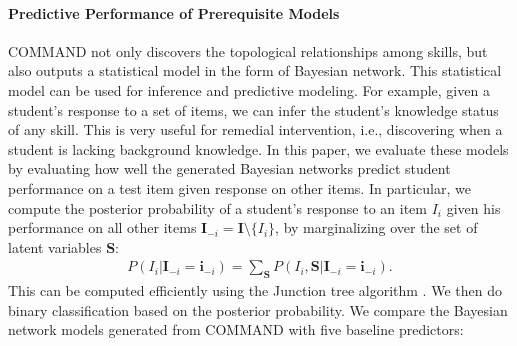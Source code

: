 \documentclass{edm_template}
\begin{document}
	\paragraph{Predictive Performance of Prerequisite Models}
	\label{sec:predictive_performance}
	COMMAND not only discovers the topological relationships among skills, but also outputs a statistical model in the form of Bayesian network.
	This statistical model can be used for inference and predictive modeling.
	For example, given a student's response to a set of items, we can infer the student's knowledge status of any skill.
	This is very useful for remedial intervention, i.e., discovering when a student is lacking background knowledge. 
	In this paper, we evaluate these models by evaluating how well the generated Bayesian networks predict student performance
	on a test item given response on other items.
	In particular, we compute the posterior probability of a student's response to an item $I_i$ given his performance on all other items 
	$\mathbf{I}_{-i}=\mathbf{I}\setminus\{I_i\}$, by marginalizing over the set of latent variables $\mathbf{S}$:
	\begin{align}
		P(I_i|\mathbf{I}_{-i}=\mathbf{i}_{-i}) =\sum_{\mathbf{S}}P(I_i, \mathbf{S}|\mathbf{I}_{-i}=\mathbf{i}_{-i}).
	\end{align}
	This can be computed efficiently using the Junction tree algorithm \cite{koller2009probabilistic}. 
	We then do binary classification based on the posterior probability.
	We compare the Bayesian network models generated from COMMAND with five baseline predictors:
\end{document}
